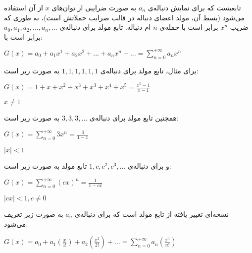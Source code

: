 
\begin{definition}
    تابعیست که برای نمایش دنباله‌ی 
    $a_{n}$ 
    به صورت ضرایبی از توان‌های 
    $x$
    از آن استفاده می‌شود (بسط آن، مولد اعضای دنباله در قالب ضرایب جملاتش است)، به طوری که ضریب 
    $x^{n}$
    برابر است با جمله‌ی
    $n$
    ام دنباله. تابع مولد برای دنباله‌ی 
    $a_{0}, a_{1}, a_{2}, ..., a_{n}, ... $
    برابر است با:
    \begin{center}
        $G(x)= a_{0} + a_{1}x^{1} + a_{2}x^{2} + ... + a_{n}x^{n} + ... = \sum			\limits_{n=0}^{+\infty} a_{n}x^{n}$
    \end{center}
\end{definition}

برای مثال،
تابع مولد برای دنباله‌ی 
$1, 1, 1, 1, 1, 1$ 
به صورت زیر است:
\begin{center}
    $G(x)= 1 + x + x^2 + x^3 + x^3 + x^4 + x^5 = \frac{x^6-1}{x-1}$
    
    $x \neq 1$	
\end{center}

همچنین
تابع مولد برای دنباله‌ی 
$3, 3, 3, ...$
به صورت زیر است: 
\begin{center}
    $G(x)= \sum\limits_{n=0}^{+\infty} 3x^{n} = \frac{3}{1-x}$
    
    $|x| < 1$	
\end{center}

و برای دنباله‌ی 
$1, c, c^2, c^3, ...$
تابع مولد به صورت زیر است: 
\begin{center}
    $G(x)= \sum\limits_{n=0}^{+\infty} (cx)^{n} = \frac{1}{1-cx}$
            
    $|cx| < 1 , c \neq 0$
\end{center}









\begin{definition}
    نسخه‌ای تغییر یافته از تابع مولد است که
    برای دنباله‌ی 
    $a_{n}$
    به صورت زیر تعریف می‌شود:
    \begin{center}
      $G(x)= a_{0} + a_{1}(\frac{x}{1!}) + a_{2}(\frac{x^{2}}{2!}) + ... = 
      \sum\limits_{n=0}^{+\infty} a_{n}(\frac{x^{n}}{n!})$
    \end{center}
\end{definition}

